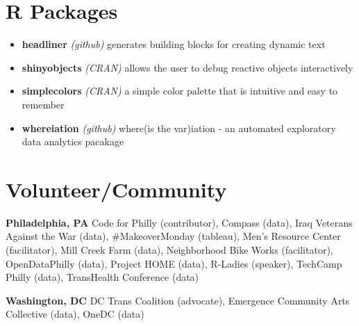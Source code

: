 \documentclass[11pt, a4paper]{awesome-cv}
\providecommand{\tightlist}{%
	\setlength{\itemsep}{0pt}\setlength{\parskip}{0pt}}
\begin{document}
\hypertarget{r-packages}{%
\section{\texorpdfstring{ R
Packages}{ R Packages}}\label{r-packages}}

\begin{itemize}
\tightlist
\item
  \textbf{headliner} \emph{(github)} generates building blocks for
  creating dynamic text
\item
  \textbf{shinyobjects} \emph{(CRAN)} allows the user to debug reactive
  objects interactively
\item
  \textbf{simplecolors} \emph{(CRAN)} a simple color palette that is
  intuitive and easy to remember
\item
  \textbf{whereiation} \emph{(github)} where(is the var)iation - an
  automated exploratory data analytics pacakage
\end{itemize}

\hypertarget{volunteercommunity}{%
\section{\texorpdfstring{
Volunteer/Community}{ Volunteer/Community}}\label{volunteercommunity}}

\textbf{Philadelphia, PA} Code for Philly (contributor), Compass (data),
Iraq Veterans Against the War (data), \#MakeoverMonday (tableau), Men's
Resource Center (facilitator), Mill Creek Farm (data), Neighborhood Bike
Works (facilitator), OpenDataPhilly (data), Project HOME (data),
R-Ladies (speaker), TechCamp Philly (data), TransHealth Conference
(data)

\textbf{Washington, DC} DC Trans Coalition (advocate), Emergence
Community Arts Collective (data), OneDC (data)
\end{document}
